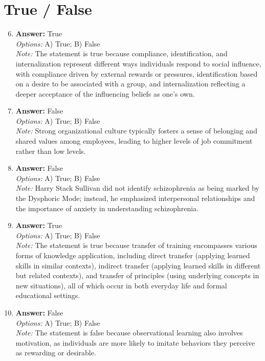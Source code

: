 \documentclass[12pt]{article}
\begin{document}
\section*{True / False}
\begin{enumerate}[label=\arabic*.]
\setcounter{enumi}{5}
\item \textbf{Answer:} True
\\ \textit{Options:} A) True; B) False
\\ \textit{Note:} The statement is true because compliance, identification, and internalization represent different ways individuals respond to social influence, with compliance driven by external rewards or pressures, identification based on a desire to be associated with a group, and internalization reflecting a deeper acceptance of the influencing beliefs as one's own.
\item \textbf{Answer:} False
\\ \textit{Options:} A) True; B) False
\\ \textit{Note:} Strong organizational culture typically fosters a sense of belonging and shared values among employees, leading to higher levels of job commitment rather than low levels.
\item \textbf{Answer:} False
\\ \textit{Options:} A) True; B) False
\\ \textit{Note:} Harry Stack Sullivan did not identify schizophrenia as being marked by the Dysphoric Mode; instead, he emphasized interpersonal relationships and the importance of anxiety in understanding schizophrenia.
\item \textbf{Answer:} True
\\ \textit{Options:} A) True; B) False
\\ \textit{Note:} The statement is true because transfer of training encompasses various forms of knowledge application, including direct transfer (applying learned skills in similar contexts), indirect transfer (applying learned skills in different but related contexts), and transfer of principles (using underlying concepts in new situations), all of which occur in both everyday life and formal educational settings.
\item \textbf{Answer:} False
\\ \textit{Options:} A) True; B) False
\\ \textit{Note:} The statement is false because observational learning also involves motivation, as individuals are more likely to imitate behaviors they perceive as rewarding or desirable.
\end{enumerate}
\end{document}
